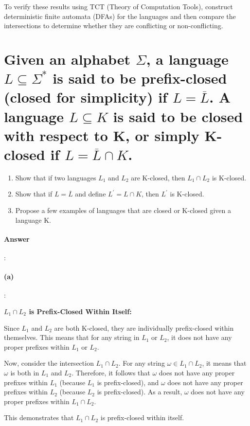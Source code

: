 \documentclass{article}
\begin{document}
To verify these results using TCT (Theory of Computation Tools), construct deterministic finite automata (DFAs) for the languages and then compare the intersections to determine whether they are conflicting or non-conflicting.

\section{Given an alphabet $\Sigma$, a language $L \subseteq  \Sigma^*$ is said to be prefix-closed (closed for simplicity) if $L = \overline{L}$. A language $L \subseteq  K$ is said to be closed with respect to K, or simply K-closed if $L = \overline{L} \cap K$.}

\begin{enumerate}[label=(\alph*)]
  \item Show that if two languages $L_1$ and $L_2$ are K-closed, then $L_1 \cap L_2$ is K-closed.
  \item Show that if $L = \overline{L}$ and define $L^\prime  = L \cap K$, then $L^\prime$ is K-closed.
  \item Propose a few examples of languages that are closed or K-closed given a language K.
\end{enumerate}

\paragraph{Answer}:

\paragraph{(a)}:

\textbf{$L_1 \cap L_2$ is Prefix-Closed Within Itself:}

Since $L_1$ and $L_2$ are both K-closed, they are individually prefix-closed within themselves. This means that for any string in $L_1$ or $L_2$, it does not have any proper prefixes within $L_1$ or $L_2$.

Now, consider the intersection $L_1 \cap L_2$. For any string $\omega \in L_1 \cap L_2$, it means that $\omega$ is both in $L_1$ and $L_2$. Therefore, it follows that $\omega$ does not have any proper prefixes within $L_1$ (because $L_1$ is prefix-closed), and $\omega$ does not have any proper prefixes within $L_2$ (because $L_2$ is prefix-closed). As a result, $\omega$ does not have any proper prefixes within $L_1 \cap L_2$.

This demonstrates that $L_1 \cap L_2$ is prefix-closed within itself.
\end{document}
